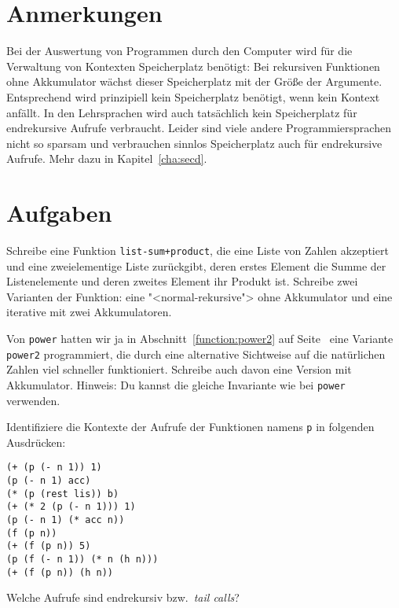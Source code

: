 \section*{Anmerkungen}

Bei der Auswertung von Programmen durch den Computer wird für die
Verwaltung von Kontexten Speicherplatz benötigt: Bei rekursiven
Funktionen ohne Akkumulator wächst dieser Speicherplatz mit der Größe
der Argumente.  Entsprechend wird prinzipiell kein Speicherplatz
benötigt, wenn kein Kontext anfällt.  In den Lehrsprachen wird auch tatsächlich
kein Speicherplatz für endrekursive Aufrufe verbraucht.
Leider sind viele andere Programmiersprachen nicht so sparsam und
verbrauchen sinnlos Speicherplatz auch für endrekursive Aufrufe.
Mehr dazu in Kapitel~\ref{cha:secd}.

\section*{Aufgaben}

\begin{aufgabe}
  Schreibe eine Funktion \texttt{list-sum+product}, die eine
  Liste von Zahlen akzeptiert und eine zweielementige Liste
  zurückgibt, deren erstes Element die Summe der Listenelemente und
  deren zweites Element ihr Produkt ist.  Schreibe zwei Varianten
  der Funktion: eine "<normal-rekursive"> ohne Akkumulator und eine
  iterative mit zwei Akkumulatoren.
\end{aufgabe}

\begin{aufgabe}
  Von \lstinline{power} hatten wir ja in
  Abschnitt~\ref{function:power2} auf Seite~\pageref{function:power2}
  eine Variante \lstinline{power2} programmiert, die durch eine
  alternative Sichtweise auf die natürlichen Zahlen viel schneller
  funktioniert.  Schreibe auch davon eine Version mit Akkumulator.
  Hinweis: Du kannst die gleiche Invariante wie bei \lstinline{power}
  verwenden.
\end{aufgabe}

\begin{aufgabe}
  Identifiziere die Kontexte der Aufrufe der Funktionen namens
  \texttt{p} in folgenden Ausdrücken:
  
\begin{lstlisting}
(+ (p (- n 1)) 1)
(p (- n 1) acc)
(* (p (rest lis)) b)
(+ (* 2 (p (- n 1))) 1)
(p (- n 1) (* acc n))
(f (p n))
(+ (f (p n)) 5)
(p (f (- n 1)) (* n (h n))) 
(+ (f (p n)) (h n))
\end{lstlisting}
  Welche Aufrufe sind endrekursiv bzw.\ \textit{tail calls}?
\end{aufgabe}

